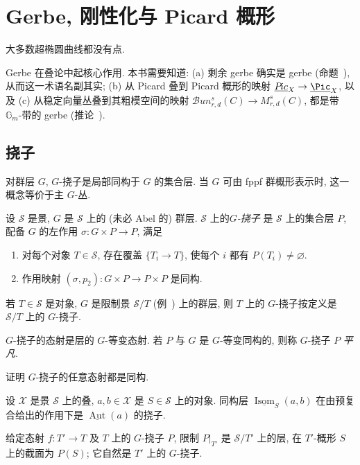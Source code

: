 \section{Gerbe, 刚性化与 Picard 概形}\label{src:7.4}
\begin{epigraph}
大多数超椭圆曲线都没有点.
\end{epigraph}
Gerbe 在叠论中起核心作用. 本书需要知道: (a) 剩余 gerbe 确实是 gerbe (命题~), 从而这一术语名副其实; (b) 从 Picard 叠到 Picard 概形的映射 $\underline{\mathcal P\!ic}_X\to\underline{\Pic}_X$, 以及 (c) 从稳定向量丛叠到其粗模空间的映射 $\mathcal B\!un_{r,d}^s(C)\to M_{r,d}^s(C)$, 都是带 $\mathbb G_m$-带的 gerbe (推论~).
\subsection{挠子}\label{src:7.4.1-subsection}
对群层 $G$, $G$-挠子是局部同构于 $G$ 的集合层. 当 $G$ 可由 fppf 群概形表示时, 这一概念等价于主 $G$-丛.
\begin{definition}[挠子]\label{src:7.4.1}
设 $\mathcal S$ 是景, $G$ 是 $\mathcal S$ 上的 (未必 Abel 的) 群层. $\mathcal S$ 上的\emph{$G$-挠子} 是 $\mathcal S$ 上的集合层 $P$, 配备 $G$ 的左作用 $\sigma:G\times P\to P$, 满足
\begin{enumerate}[(1)]
\item 对每个对象 $T\in\mathcal S$, 存在覆盖 $\{T_i\to T\}$, 使每个 $i$ 都有 $P(T_i)\neq\varnothing$.
\item 作用映射 $(\sigma,p_2):G\times P\to P\times P$ 是同构.
\end{enumerate}
若 $T\in\mathcal S$ 是对象, $G$ 是限制景 $\mathcal S/T$ (例~) 上的群层, 则 $T$ 上的 $G$-挠子按定义是 $\mathcal S/T$ 上的 $G$-挠子.
\end{definition}
$G$-挠子的态射是层的 $G$-等变态射. 若 $P$ 与 $G$ 是 $G$-等变同构的, 则称 $G$-挠子 $P$ \emph{平凡}.
\begin{exercise}\label{src:7.4.2}
证明 $G$-挠子的任意态射都是同构.
\end{exercise}
\begin{example}\label{src:7.4.3}
设 $\mathcal X$ 是景 $\mathcal S$ 上的叠, $a,b\in\mathcal X$ 是 $S\in\mathcal S$ 上的对象. 同构层 $\underline{\operatorname{Isom}}_S(a,b)$ 在由预复合给出的作用下是 $\underline{\operatorname{Aut}}(a)$ 的挠子.
\end{example}
给定态射 $f:T'\to T$ 及 $T$ 上的 $G$-挠子 $P$, 限制 $P|_{T'}$ 是 $\mathcal S/T'$ 上的层, 在 $T'$-概形 $S$ 上的截面为 $P(S)$; 它自然是 $T'$ 上的 $G$-挠子.
